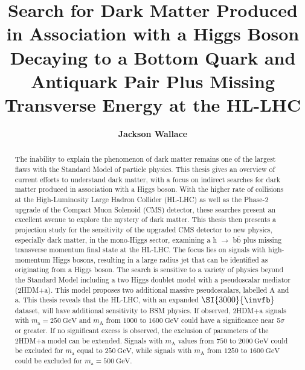 \documentclass[12pt, letterpaper]{report}
\title{\textbf{Search for Dark Matter Produced in Association with a Higgs Boson Decaying to a Bottom Quark and Antiquark Pair Plus Missing Transverse Energy at the HL-LHC}}
\author{\textbf{Jackson Wallace}}
\DeclareRobustCommand{\GeV}[1]{\ensuremath{\SI{#1}{\GeV}}}
\newcommand{\fbinv}[1]{\SI{#1}{\invfb}}
\numberwithin{equation}{chapter}
\begin{document}
\maketitle
\tableofcontents


\begin{abstract}
The inability to explain the phenomenon of dark matter remains one of the largest flaws with the Standard Model of particle physics.
This thesis gives an overview of current efforts to understand dark matter, with a focus on indirect searches for dark matter produced in association with a Higgs boson. 
With the higher rate of collisions at the High-Luminosity Large Hadron Collider (HL-LHC) as well as the  Phase-2 upgrade of the Compact Muon Solenoid (CMS) detector, these searches present an excellent avenue to explore the mystery of dark matter. 
This thesis then presents a projection study for the sensitivity of the upgraded CMS detector to new physics, especially dark matter, in the mono-Higgs sector, examining a h $\to$ b$\bar{\mathrm{b}}$ plus missing transverse momentum final state at the HL-LHC.
The focus lies on signals with high-momentum Higgs bosons, resulting in a large radius jet that can be identified as originating from a Higgs boson.
The search is sensitive to a variety of physics beyond the Standard Model including a two Higgs doublet model with a pseudoscalar mediator (2HDM+a). This model proposes two additional massive pseudoscalars, labelled A and a. This thesis reveals that the HL-LHC, with an expanded $\fbinv{3000}$ dataset, will have additional sensitivity to BSM physics. If observed, 2HDM+a signals with $m_\mathrm{a} = \GeV{250}$ and $m_\mathrm{A}$ from $1000$ to $\GeV{1600}$ could have a significance near 5$\sigma$ or greater.
If no significant excess is observed, the exclusion of parameters of the 2HDM+a model can be extended. Signals with $m_\mathrm{A}$ values from $750$ to $\GeV{2000}$ could be excluded for $m_\mathrm{a}$ equal to $\GeV{250}$, while signals with $m_\mathrm{A}$ from $1250$ to $\GeV{1600}$ could be excluded for $m_\mathrm{a} = \GeV{500}$. 
\end{abstract}











\appendix


\titleformat{\chapter}{}{}{0em}{\bf\LARGE}

\clearpage



\clearpage
{}

\end{document}
